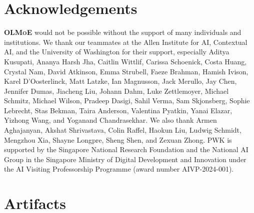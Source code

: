 \documentclass{article}
\newcommand{\model}{\textbf{\textsc{OLMoE}}}
\begin{document}
\section*{Acknowledgements}
\label{sec:ack}

\model{} would not be possible without the support of many individuals and institutions. We thank our teammates at the Allen Institute for AI, Contextual AI, and the University of Washington for their support, especially Aditya Kusupati, Ananya Harsh Jha, Caitlin Wittlif, Carissa Schoenick, Costa Huang, Crystal Nam, David Atkinson, Emma Strubell, Faeze Brahman, Hamish Ivison, Karel D'Oosterlinck, Matt Latzke, Ian Magnusson, Jack Merullo, Jay Chen, Jennifer Dumas, Jiacheng Liu, Johann Dahm, Luke Zettlemoyer, Michael Schmitz, Michael Wilson, Pradeep Dasigi, Sahil Verma, Sam Skjonsberg, Sophie Lebrecht, Stas Bekman, Taira Anderson, Valentina Pyatkin, Yanai Elazar, Yizhong Wang, and Yoganand Chandrasekhar. We also thank Armen Aghajanyan, Akshat Shrivastava, Colin Raffel, Haokun Liu, Ludwig Schmidt, Mengzhou Xia, Shayne Longpre, Sheng Shen, and Zexuan Zhong. PWK is supported by the Singapore National Research Foundation and the National AI Group in the Singapore Ministry of Digital Development and Innovation under the AI Visiting Professorship Programme (award number AIVP-2024-001).

\newpage




\newpage
\appendix

\section{Artifacts}
\label{sec:artifacts}
\end{document}
